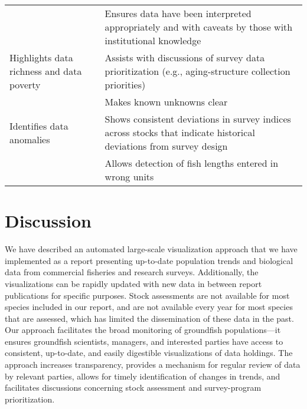 \documentclass[12pt,]{article}
\begin{document}
\begin{table}
\begin{tabular}[t]{>{\raggedright\arraybackslash}p{6.0cm}>{\raggedright\arraybackslash}p{10cm}}
\addlinespace
 & Ensures data have been interpreted appropriately and with caveats by those with institutional knowledge\\
\addlinespace
Highlights data richness and data poverty & Assists with discussions of survey data prioritization (e.g., aging-structure collection priorities)\\
\addlinespace
 & Makes known unknowns clear\\
\addlinespace
Identifies data anomalies & Shows consistent deviations in survey indices across stocks that indicate historical deviations from survey design\\
\addlinespace
 & Allows detection of fish lengths entered in wrong units\\
\bottomrule
\end{tabular}
\end{table}

\clearpage

\hypertarget{discussion}{%
\section*{Discussion}\label{discussion}}

We have described an automated large-scale visualization approach that we have implemented as a report presenting up-to-date population trends and biological data from commercial fisheries and research surveys. Additionally, the visualizations can be rapidly updated with new data in between report publications for specific purposes. Stock assessments are not available for most species included in our report, and are not available every year for most species that are assessed, which has limited the dissemination of these data in the past. Our approach facilitates the broad monitoring of groundfish populations---it ensures groundfish scientists, managers, and interested parties have access to consistent, up-to-date, and easily digestible visualizations of data holdings. The approach increases transparency, provides a mechanism for regular review of data by relevant parties, allows for timely identification of changes in trends, and facilitates discussions concerning stock assessment and survey-program prioritization.
\end{document}

